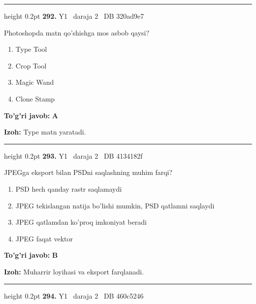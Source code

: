 \documentclass[10pt,a4paper,oneside]{article}
\begin{document}
\vspace{2mm}\hrule height 0.2pt \vspace{4mm}
\hypertarget{q292}{\textbf{\color{ink}292.}}  {\color{muted}\scriptsize Y1 \textbullet\ daraja 2 \textbullet\ DB 320ad9e7}
\par
Photoshopda matn qo'shishga mos asbob qaysi?
\begin{enumerate}[label=\Alph*),leftmargin=9mm]
\item Type Tool
\item Crop Tool
\item Magic Wand
\item Clone Stamp
\end{enumerate}
\begin{tcolorbox}[enhanced,breakable,colback=teal!4,colframe=teal!45!black,boxrule=0.45pt,arc=1.2mm,left=2.8mm,right=2.8mm,top=2mm,bottom=2mm,before skip=2mm,after skip=2mm]
\textbf{\color{teal}To'g'ri javob:} \textbf{A}
\par\smallskip
\textbf{Izoh:} Type matn yaratadi.
\end{tcolorbox}
\vspace{2mm}\hrule height 0.2pt \vspace{4mm}
\hypertarget{q293}{\textbf{\color{ink}293.}}  {\color{muted}\scriptsize Y1 \textbullet\ daraja 2 \textbullet\ DB 4134182f}
\par
JPEGga eksport bilan PSDni saqlashning muhim farqi?
\begin{enumerate}[label=\Alph*),leftmargin=9mm]
\item PSD hech qanday rastr saqlamaydi
\item JPEG tekislangan natija bo'lishi mumkin, PSD qatlamni saqlaydi
\item JPEG qatlamdan ko'proq imkoniyat beradi
\item JPEG faqat vektor
\end{enumerate}
\begin{tcolorbox}[enhanced,breakable,colback=teal!4,colframe=teal!45!black,boxrule=0.45pt,arc=1.2mm,left=2.8mm,right=2.8mm,top=2mm,bottom=2mm,before skip=2mm,after skip=2mm]
\textbf{\color{teal}To'g'ri javob:} \textbf{B}
\par\smallskip
\textbf{Izoh:} Muharrir loyihasi va eksport farqlanadi.
\end{tcolorbox}
\vspace{2mm}\hrule height 0.2pt \vspace{4mm}
\hypertarget{q294}{\textbf{\color{ink}294.}}  {\color{muted}\scriptsize Y1 \textbullet\ daraja 2 \textbullet\ DB 460c5246}
\end{document}
